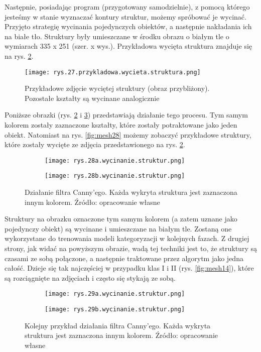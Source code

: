 Następnie, posiadając program (przygotowany samodzielnie), z pomocą którego jesteśmy w stanie wyznaczać kontury struktur, możemy spróbować je wycinać. Przyjęto strategię wycinania pojedynczych obiektów, a następnie nakładania ich na białe tło. Struktury były umieszczane w środku obrazu o białym tle o wymiarach 335 x 251 (szer. x wys.). Przykładowa wycięta struktura znajduje się na rys. \ref{fig:mesh26}.
\begin{figure}[h]
    \centering
    \texttt{[image: rys.27.przykladowa.wycieta.struktura.png]}
    \caption{Przykładowe zdjęcie wyciętej struktury (obraz przybliżony). Pozostałe kształty są wycinane analogicznie}
    \label{fig:mesh26}
\end{figure}
Poniższe obrazki (rys. \ref{fig:mesh26} i \ref{fig:mesh27}) przedstawiają działanie tego procesu. Tym samym kolorem zostały zaznaczone kształty, które zostały potraktowane jako jeden obiekt. Natomiast na rys. \ref{fig:mesh28} możemy zobaczyć przykładowe struktury, które zostały wycięte ze zdjęcia przedstawionego na rys. \ref{fig:mesh26}. 
\begin{figure}[h]
	\centering
	\begin{subfigure}{0.29\textwidth}
	    \centering
	    \texttt{[image: rys.28a.wycinanie.struktur.png]}
	\end{subfigure}
	\begin{subfigure}{0.29\textwidth}
	    \centering
	    \texttt{[image: rys.28b.wycinanie.struktur.png]}
	\end{subfigure}
	\caption{\label{fig:mesh26}Działanie filtra Canny'ego. Każda wykryta struktura jest zaznaczona innym kolorem. Źródło: opracowanie własne}
\end{figure}
Struktury na obrazku oznaczone tym samym kolorem (a zatem uznane jako pojedynczy obiekt) są wycinane i umieszczane na białym tle. Zostaną one wykorzystane do trenowania modeli kategoryzacji w kolejnych fazach. Z drugiej strony, jak widać na powyższym obrazie, wadą tej techniki jest to, że struktury są czasami ze sobą połączone, a następnie traktowane przez algorytm jako jedna całość. Dzieje się tak najczęściej w przypadku klas I i II (rys. \ref{fig:mesh14}), które są rozciągnięte na zdjęciach i często się stykają ze sobą. 
\begin{figure}[h]
	\centering
	\begin{subfigure}{0.29\textwidth}
	    \centering
	    \texttt{[image: rys.29a.wycinanie.struktur.png]}
	\end{subfigure}
	\begin{subfigure}{0.29\textwidth}
	    \centering
	    \texttt{[image: rys.29b.wycinanie.struktur.png]}
	\end{subfigure}
	\caption{\label{fig:mesh27}Kolejny przykład działania filtra Canny'ego. Każda wykryta struktura jest zaznaczona innym kolorem. Źródło: opracowanie własne}
\end{figure}
